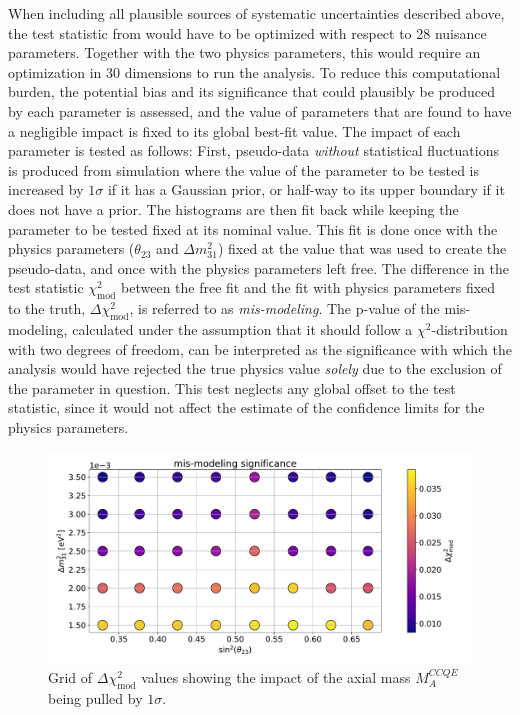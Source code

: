 When including all plausible sources of systematic uncertainties described above, the test statistic from  would have to be optimized with respect to 28 nuisance parameters. Together with the two physics parameters, this would require an optimization in 30 dimensions to run the analysis. To reduce this computational burden, the potential bias and its significance that could plausibly be produced by each parameter is assessed, and the value of parameters that are found to have a negligible impact is fixed to its global best-fit value. The impact of each parameter is tested as follows: First, pseudo-data \emph{without} statistical fluctuations is produced from simulation where the value of the parameter to be tested is increased by $1\sigma$ if it has a Gaussian prior, or half-way to its upper boundary if it does not have a prior. The histograms are then fit back while keeping the parameter to be tested fixed at its nominal value. This fit is done once with the physics parameters ($\theta_{23}$ and $\Delta m^2_{31}$) fixed at the value that was used to create the pseudo-data, and once with the physics parameters left free. The difference in the test statistic $\chi^2_{\mathrm{mod}}$ between the free fit and the fit with physics parameters fixed to the truth, $\Delta \chi^2_{\mathrm{mod}}$, is referred to as \emph{mis-modeling}.
The p-value of the mis-modeling, calculated under the assumption that it should follow a $\chi^2$-distribution with two degrees of freedom, can be interpreted as the significance with which the analysis would have rejected the true physics value \emph{solely} due to the exclusion of the parameter in question.
This test neglects any global offset to the test statistic, since it would not affect the estimate of the confidence limits for the physics parameters.
\begin{figure}
    \centering
    \includegraphics[width=\linewidth]{figures/measurement/three_flavor/asimov_test/systematic_impact_test-asimov_test-000015_GENIE_MA_QE.pdf}
    \caption{Grid of $\Delta \chi^2_{\mathrm{mod}}$ values showing the impact of the axial mass $M_A^{CCQE}$ being pulled by $1\sigma$.}
    \label{fig:systematic-impact-mismod-example}
\end{figure}
